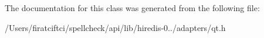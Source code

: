 The documentation for this class was generated from the following file\+:\begin{DoxyCompactItemize}
\item 
/\+Users/firatciftci/spellcheck/api/lib/hiredis-\/0../adapters/qt.\+h\end{DoxyCompactItemize}
